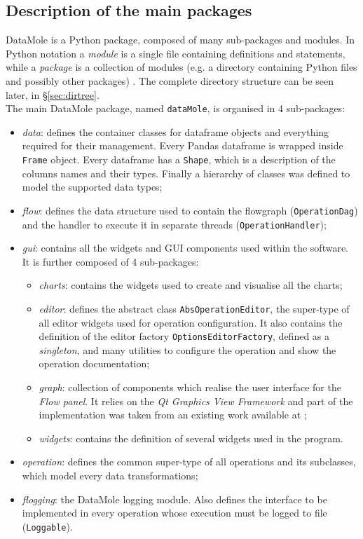 \subsection{Description of the main packages}
\label{ssec:packages}
DataMole is a Python package, composed of many sub-packages and modules. In Python notation a \textit{module} is a single file containing definitions and statements, while a \textit{package} is a collection of modules (e.g. a directory containing Python files and possibly other packages) \cite{docs:python-mod-pack}. The complete directory structure can be seen later, in §\ref{sec:dirtree}.\\
The main DataMole package, named \texttt{dataMole}, is organised in 4 sub-packages:
\begin{itemize}
	\item \textit{data}: defines the container classes for dataframe objects and everything required for their management. Every Pandas dataframe is wrapped inside \texttt{Frame} object. Every dataframe has a \texttt{Shape}, which is a description of the columns names and their types. Finally a hierarchy of classes was defined to model the supported data types;
	\item \textit{flow}: defines the data structure used to contain the flowgraph (\texttt{OperationDag}) and the handler to execute it in separate threads (\texttt{OperationHandler});
	\item \textit{gui}: contains all the widgets and GUI components used within the software. It is further composed of 4 sub-packages:
	\begin{itemize}
		\item \textit{charts}: contains the widgets used to create and visualise all the charts;
		\item \textit{editor}: defines the abstract class \texttt{AbsOperationEditor}, the super-type of all editor widgets used for operation configuration. It also contains the definition of the editor factory \texttt{OptionsEditorFactory}, defined as a \textit{singleton}, and many utilities to configure the operation and show the operation documentation;
		\item \textit{graph}: collection of components which realise the user interface for the \textit{Flow panel}. It relies on the \textit{Qt Graphics View Framework} and part of the implementation was taken from an existing work available at \cite{site:nodegraph-pyqt};
		\item \textit{widgets}: contains the definition of several widgets used in the program.
	\end{itemize}
	\item \textit{operation}: defines the common super-type of all operations and its subclasses, which model every data transformations;
	\item \textit{flogging}: the DataMole logging module. Also defines the interface to be implemented in every operation whose execution must be logged to file (\texttt{Loggable}).
\end{itemize}

